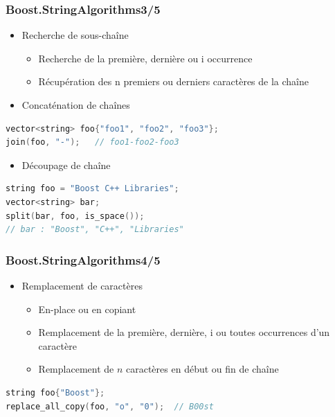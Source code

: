 \documentclass[C++.tex]{subfiles}
\begin{document}
\begin{frame}[fragile]
	\frametitle{Boost.StringAlgorithms\titlehfill{}3/5}
	\begin{itemize}
		\item Recherche de sous-chaîne
		\begin{itemize}
			\item Recherche de la première, dernière ou i\ieme{} occurrence
			\item Récupération des n premiers ou derniers caractères de la chaîne
		\end{itemize}
		\item Concaténation de chaînes
	\end{itemize}

	\begin{lstlisting}[language=C++]
vector<string> foo{"foo1", "foo2", "foo3"};
join(foo, "-");   // foo1-foo2-foo3\end{lstlisting}

	\begin{itemize}
		\item Découpage de chaîne
	\end{itemize}

	\begin{lstlisting}[language=C++]
string foo = "Boost C++ Libraries";
vector<string> bar;
split(bar, foo, is_space());
// bar : "Boost", "C++", "Libraries"\end{lstlisting}
\end{frame}

\begin{frame}[fragile]
	\frametitle{Boost.StringAlgorithms\titlehfill{}4/5}
	\begin{itemize}
		\item Remplacement de caractères
		\begin{itemize}
			\item En-place ou en copiant
			\item Remplacement de la première, dernière, i\ieme{} ou toutes occurrences d'un caractère
			\item Remplacement de $n$ caractères en début ou fin de chaîne
		\end{itemize}
	\end{itemize}

	\begin{lstlisting}[language=C++]
string foo{"Boost"};
replace_all_copy(foo, "o", "0");  // B00st\end{lstlisting}
\end{frame}
\end{document}
